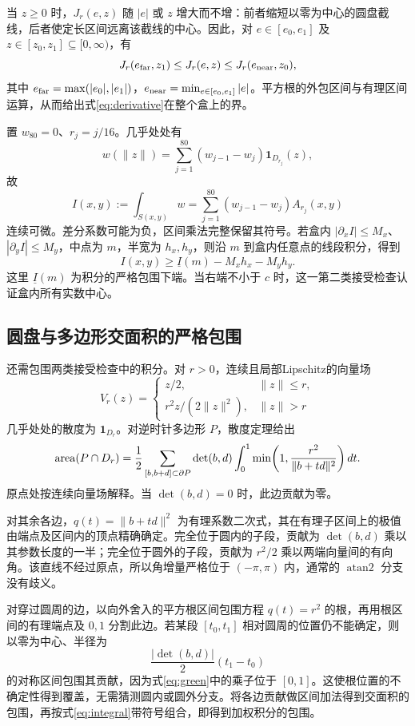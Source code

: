 \documentclass[11pt]{article}
\begin{document}
当 $z\ge0$ 时，$J_r(e,z)$ 随 $|e|$ 或 $z$ 增大而不增：前者缩短以零为中心的圆盘截线，后者使定长区间远离该截线的中心。因此，对 $e\in[e_0,e_1]$ 及 $z\in[z_0,z_1]\subseteq[0,\infty)$，有
\[
J_r(e_{\rm far},z_1)\le J_r(e,z)\le J_r(e_{\rm near},z_0),
\]
其中 $e_{\rm far}=\max(|e_0|,|e_1|)$，$e_{\rm near}=\min_{e\in[e_0,e_1]}|e|$。平方根的外包区间与有理区间运算，从而给出式\eqref{eq:derivative}在整个盒上的界。

置 $w_{80}=0$、$r_j=j/16$。几乎处处有
\[
w(\|z\|)=\sum_{j=1}^{80}(w_{j-1}-w_j)\mathbf1_{D_{r_j}}(z),
\]
故
\begin{equation}\label{eq:integral}
I(x,y):=\int_{S(x,y)}w
=\sum_{j=1}^{80}(w_{j-1}-w_j)A_{r_j}(x,y)
\end{equation}
连续可微。差分系数可能为负，区间乘法完整保留其符号。若盒内 $|\partial_x I|\le M_x$、$|\partial_y I|\le M_y$，中点为 $m$，半宽为 $h_x,h_y$，则沿 $m$ 到盒内任意点的线段积分，得到
\begin{equation}\label{eq:gradient}
I(x,y)\ge\underline I(m)-M_xh_x-M_yh_y.
\end{equation}
这里 $\underline I(m)$ 为积分的严格包围下端。当右端不小于 $c$ 时，这一第二类接受检查认证盒内所有实数中心。

\subsection{圆盘与多边形交面积的严格包围}
还需包围两类接受检查中的积分。对 $r>0$，连续且局部Lipschitz的向量场
\[
V_r(z)=\begin{cases}z/2,&\|z\|\le r,\\
r^2z/(2\|z\|^2),&\|z\|>r
\end{cases}
\]
几乎处处的散度为 $\mathbf1_{D_r}$。对逆时针多边形 $P$，散度定理给出
\begin{equation}\label{eq:green}
\operatorname{area}(P\cap D_r)=\frac12\sum_{[b,b+d]\subset\partial P}
\det(b,d)\int_0^1\min\!\left(1,\frac{r^2}{\|b+td\|^2}\right)dt.
\end{equation}
原点处按连续向量场解释。当 $\det(b,d)=0$ 时，此边贡献为零。

对其余各边，$q(t)=\|b+td\|^2$ 为有理系数二次式，其在有理子区间上的极值由端点及区间内的顶点精确确定。完全位于圆内的子段，贡献为 $\det(b,d)$ 乘以其参数长度的一半；完全位于圆外的子段，贡献为 $r^2/2$ 乘以两端向量间的有向角。该直线不经过原点，所以角增量严格位于 $(-\pi,\pi)$ 内，通常的 $\operatorname{atan2}$ 分支没有歧义。

对穿过圆周的边，以向外舍入的平方根区间包围方程 $q(t)=r^2$ 的根，再用根区间的有理端点及 $0,1$ 分割此边。若某段 $[t_0,t_1]$ 相对圆周的位置仍不能确定，则以零为中心、半径为
\[
\frac{|\det(b,d)|}{2}(t_1-t_0)
\]
的对称区间包围其贡献，因为式\eqref{eq:green}中的乘子位于 $[0,1]$。这使根位置的不确定性得到覆盖，无需猜测圆内或圆外分支。将各边贡献做区间加法得到交面积的包围，再按式\eqref{eq:integral}带符号组合，即得到加权积分的包围。
\end{document}
